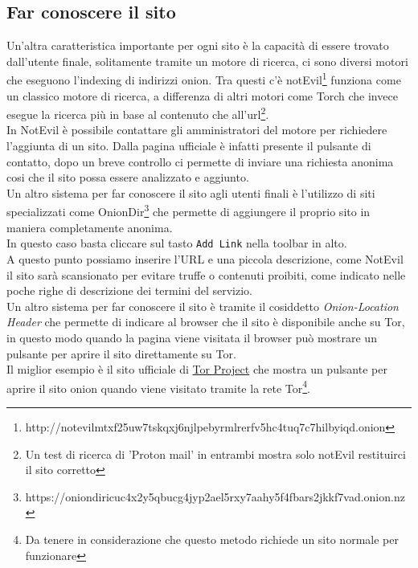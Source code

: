 \subsection{Far conoscere il sito}
Un'altra caratteristica importante per ogni sito è la capacità di essere trovato dall'utente finale, solitamente tramite un motore di ricerca, ci sono diversi motori che eseguono l'indexing di indirizzi onion. Tra questi c'è notEvil\footnote{http://notevilmtxf25uw7tskqxj6njlpebyrmlrerfv5hc4tuq7c7hilbyiqd.onion} funziona come un classico motore di ricerca, a differenza di altri motori come Torch che invece esegue la ricerca più in base al contenuto che all'url\footnote{Un test di ricerca di 'Proton mail' in entrambi mostra solo notEvil restituirci il sito corretto}. \\
In NotEvil è possibile contattare gli amministratori del motore per richiedere l'aggiunta di un sito. 
Dalla pagina ufficiale è infatti presente il pulsante di contatto, dopo un breve controllo ci permette di inviare una richiesta anonima cosi che il sito possa essere analizzato e aggiunto. \\
Un altro sistema per far conoscere il sito agli utenti finali è l'utilizzo di siti specializzati come OnionDir\footnote{https://oniondiricuc4x2y5qbucg4jyp2ael5rxy7aahy5f4fbars2jkkf7vad.onion.nz} che permette di aggiungere il proprio sito in maniera completamente anonima. \\
In questo caso basta cliccare sul tasto \lstinline{Add Link} nella toolbar in alto. \\
A questo punto possiamo inserire l'URL e una piccola descrizione, come NotEvil il sito sarà scansionato per evitare truffe o contenuti proibiti, come indicato nelle poche righe di descrizione dei termini del servizio. \\
\newpage
Un altro sistema per far conoscere il sito è tramite il cosiddetto \emph{Onion-Location Header} che permette di indicare al browser che il sito è disponibile anche su Tor, in questo modo quando la pagina viene visitata il browser può mostrare un pulsante per aprire il sito direttamente su Tor. \\
Il miglior esempio è il sito ufficiale di \href{www.torproject.org}{Tor Project} che mostra un pulsante per aprire il sito onion quando viene visitato tramite la rete Tor\footnote{Da tenere in considerazione che questo metodo richiede un sito normale per funzionare}. \\

